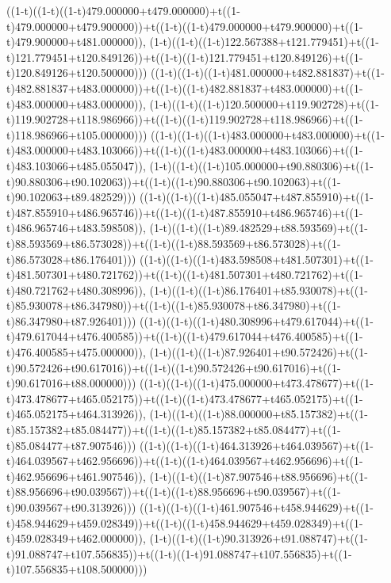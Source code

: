((1-t)((1-t)((1-t)479.000000+t479.000000)+t((1-t)479.000000+t479.900000))+t((1-t)((1-t)479.000000+t479.900000)+t((1-t)479.900000+t481.000000)),                                     (1-t)((1-t)((1-t)122.567388+t121.779451)+t((1-t)121.779451+t120.849126))+t((1-t)((1-t)121.779451+t120.849126)+t((1-t)120.849126+t120.500000)))
((1-t)((1-t)((1-t)481.000000+t482.881837)+t((1-t)482.881837+t483.000000))+t((1-t)((1-t)482.881837+t483.000000)+t((1-t)483.000000+t483.000000)),                                     (1-t)((1-t)((1-t)120.500000+t119.902728)+t((1-t)119.902728+t118.986966))+t((1-t)((1-t)119.902728+t118.986966)+t((1-t)118.986966+t105.000000)))
((1-t)((1-t)((1-t)483.000000+t483.000000)+t((1-t)483.000000+t483.103066))+t((1-t)((1-t)483.000000+t483.103066)+t((1-t)483.103066+t485.055047)),                                     (1-t)((1-t)((1-t)105.000000+t90.880306)+t((1-t)90.880306+t90.102063))+t((1-t)((1-t)90.880306+t90.102063)+t((1-t)90.102063+t89.482529)))
((1-t)((1-t)((1-t)485.055047+t487.855910)+t((1-t)487.855910+t486.965746))+t((1-t)((1-t)487.855910+t486.965746)+t((1-t)486.965746+t483.598508)),                                     (1-t)((1-t)((1-t)89.482529+t88.593569)+t((1-t)88.593569+t86.573028))+t((1-t)((1-t)88.593569+t86.573028)+t((1-t)86.573028+t86.176401)))
((1-t)((1-t)((1-t)483.598508+t481.507301)+t((1-t)481.507301+t480.721762))+t((1-t)((1-t)481.507301+t480.721762)+t((1-t)480.721762+t480.308996)),                                     (1-t)((1-t)((1-t)86.176401+t85.930078)+t((1-t)85.930078+t86.347980))+t((1-t)((1-t)85.930078+t86.347980)+t((1-t)86.347980+t87.926401)))
((1-t)((1-t)((1-t)480.308996+t479.617044)+t((1-t)479.617044+t476.400585))+t((1-t)((1-t)479.617044+t476.400585)+t((1-t)476.400585+t475.000000)),                                     (1-t)((1-t)((1-t)87.926401+t90.572426)+t((1-t)90.572426+t90.617016))+t((1-t)((1-t)90.572426+t90.617016)+t((1-t)90.617016+t88.000000)))
((1-t)((1-t)((1-t)475.000000+t473.478677)+t((1-t)473.478677+t465.052175))+t((1-t)((1-t)473.478677+t465.052175)+t((1-t)465.052175+t464.313926)),                                     (1-t)((1-t)((1-t)88.000000+t85.157382)+t((1-t)85.157382+t85.084477))+t((1-t)((1-t)85.157382+t85.084477)+t((1-t)85.084477+t87.907546)))
((1-t)((1-t)((1-t)464.313926+t464.039567)+t((1-t)464.039567+t462.956696))+t((1-t)((1-t)464.039567+t462.956696)+t((1-t)462.956696+t461.907546)),                                     (1-t)((1-t)((1-t)87.907546+t88.956696)+t((1-t)88.956696+t90.039567))+t((1-t)((1-t)88.956696+t90.039567)+t((1-t)90.039567+t90.313926)))
((1-t)((1-t)((1-t)461.907546+t458.944629)+t((1-t)458.944629+t459.028349))+t((1-t)((1-t)458.944629+t459.028349)+t((1-t)459.028349+t462.000000)),                                     (1-t)((1-t)((1-t)90.313926+t91.088747)+t((1-t)91.088747+t107.556835))+t((1-t)((1-t)91.088747+t107.556835)+t((1-t)107.556835+t108.500000)))
